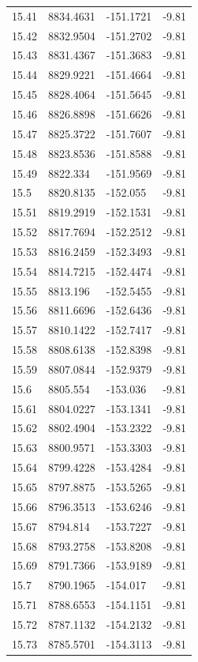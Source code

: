 \begin{table}[H]
\begin{tabular}{llll}
15.41 & 8834.4631 & -151.1721 & -9.81 \\
15.42 & 8832.9504 & -151.2702 & -9.81 \\
15.43 & 8831.4367 & -151.3683 & -9.81 \\
15.44 & 8829.9221 & -151.4664 & -9.81 \\
15.45 & 8828.4064 & -151.5645 & -9.81 \\
15.46 & 8826.8898 & -151.6626 & -9.81 \\
15.47 & 8825.3722 & -151.7607 & -9.81 \\
15.48 & 8823.8536 & -151.8588 & -9.81 \\
15.49 & 8822.334 & -151.9569 & -9.81 \\
15.5 & 8820.8135 & -152.055 & -9.81 \\
15.51 & 8819.2919 & -152.1531 & -9.81 \\
15.52 & 8817.7694 & -152.2512 & -9.81 \\
15.53 & 8816.2459 & -152.3493 & -9.81 \\
15.54 & 8814.7215 & -152.4474 & -9.81 \\
15.55 & 8813.196 & -152.5455 & -9.81 \\
15.56 & 8811.6696 & -152.6436 & -9.81 \\
15.57 & 8810.1422 & -152.7417 & -9.81 \\
15.58 & 8808.6138 & -152.8398 & -9.81 \\
15.59 & 8807.0844 & -152.9379 & -9.81 \\
15.6 & 8805.554 & -153.036 & -9.81 \\
15.61 & 8804.0227 & -153.1341 & -9.81 \\
15.62 & 8802.4904 & -153.2322 & -9.81 \\
15.63 & 8800.9571 & -153.3303 & -9.81 \\
15.64 & 8799.4228 & -153.4284 & -9.81 \\
15.65 & 8797.8875 & -153.5265 & -9.81 \\
15.66 & 8796.3513 & -153.6246 & -9.81 \\
15.67 & 8794.814 & -153.7227 & -9.81 \\
15.68 & 8793.2758 & -153.8208 & -9.81 \\
15.69 & 8791.7366 & -153.9189 & -9.81 \\
15.7 & 8790.1965 & -154.017 & -9.81 \\
15.71 & 8788.6553 & -154.1151 & -9.81 \\
15.72 & 8787.1132 & -154.2132 & -9.81 \\
15.73 & 8785.5701 & -154.3113 & -9.81 \\

\end{tabular}
\end{table}
